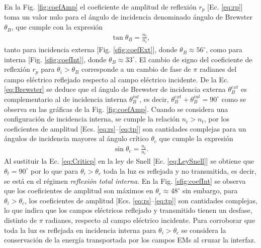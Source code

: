 En la Fig. \ref{fig:coefAmp} el coeficiente de amplitud de reflexión $r_p$ [Ec. \eqref{eq:rp}] toma un valor nulo para el ángulo de incidencia  denominado ángulo de Brewster $\theta_B$, que cumple con la expresión 
%
	\begin{align}
	\tan\theta_B = \frac{n_t}{n_i},
	\label{eq:Brewster}
	\end{align}
%	
tanto para incidencia externa [Fig. \ref{sfig:coefExt}], donde $\theta_B \approx 56^\circ$, como para interna [Fig. \ref{sfig:coefInt}], donde $\theta_B \approx 33^\circ$. El cambio de signo del coeficiente de reflexión $r_p$ para $\theta_i>\theta_B$ corresponde a un cambio de fase de $\pi$ radianes del campo eléctrico reflejado respecto al campo eléctrico incidente. De la Ec. \eqref{eq:Brewster} se deduce que el ángulo de Brewster de incidencia externa $\theta_B^{ext}$ es complementario al de incidencia interna $\theta_B^{int}$, es decir, $\theta_B^{ext}+\theta_B^{int} = 90^\circ$ como se observa en las gráficas de la Fig. \ref{fig:coefAmp}. Cuando se considera una configuración de incidencia interna, se cumple la relación $n_i>n_t$, por los coeficientes de amplitud  [Ecs. \eqref{eq:rs}--\eqref{eq:tp}] son cantidades complejas para un ángulos de incidencia mayores al ángulo crítico $\theta_c$ que cumple la expresión
% 
	\begin{align}
	\sin\theta_c = \frac{n_t}{n_i}.
	\label{eq:Criticp}
	\end{align}
%
Al sustituir la Ec. \eqref{eq:Criticp} en la ley de Snell [Ec. \eqref{eq:LeySnell}] se obtiene que $\theta_t = 90^\circ$ por lo que para $\theta_i>\theta_c$ toda la luz es reflejada y no transmitida, es decir, se está en el régimen \emph{reflexión total interna}. En la Fig. \ref{sfig:coefInt} se observa que los coeficientes de amplitud son máximos en $\theta_c \approx 48^\circ$ sin embargo, para $\theta_i>\theta_c$, los coeficientes de amplitud  [Ecs. \eqref{eq:rs}--\eqref{eq:tp}] son cantidades complejas, lo que indica que los campos eléctricos reflejado y transmitido tienen un desfase, distinto de $\pi$ radianes, respecto al campo eléctrico incidente.  Para corroborar que toda la luz es reflejada en incidencia interna para $\theta_i>\theta_c$ se considera la conservación de la energía transportada por los campos EMs al cruzar la interfaz.

